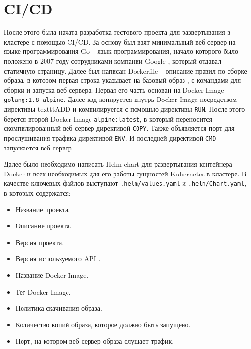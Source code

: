 \section{CI/CD}
\label{sec:ci-cd}

После этого была начата разработка тестового проекта для развертывания в кластере с помощью CI/CD.
За основу был взят минимальный веб-сервер на языке программирования Go -- язык программирования, начало которого было положено в 2007 году сотрудниками компании Google \cite{def:go},
который отдавал статичную страницу. Далее был написан Dockerfile -- описание правил по сборке образа, в котором первая строка указывает на базовый образ \cite{def:docker},
с командами для сборки и запуска веб-сервера. Первая его часть основан на Docker Image
\texttt{golang:1.8-alpine}. Далее код копируется внутрь Docker Image посредством директивы texttt{ADD} и компилируется с помощью директивы \texttt{RUN}. После этого берется второй Docker Image \texttt{alpine:latest}, в который переносится скомпилированный веб-сервер директивой \texttt{COPY}. Также объявляется порт для прослушивания трафика директивой \texttt{ENV}. И последней директивой \texttt{CMD} запускается веб-сервер.

Далее было необходимо написать Helm-chart для развертывания контейнера Docker и всех необходимых для его работы сущностей Kubernetes в кластере. В качестве ключевых файлов выступают \texttt{.helm/values.yaml} и \texttt{.helm/Chart.yaml}, в которых содержатся:

\begin{itemize}
    \item Название проекта.
    \item Описание проекта.
    \item Версия проекта.
    \item Версия используемого API \cite{def:api}.
    \item Название Docker Image.
    \item Тег Docker Image.
    \item Политика скачивания образа.
    \item Количество копий образа, которое должно быть запущено.
    \item Порт, на котором веб-сервер образа слушает трафик.
\end{itemize}


